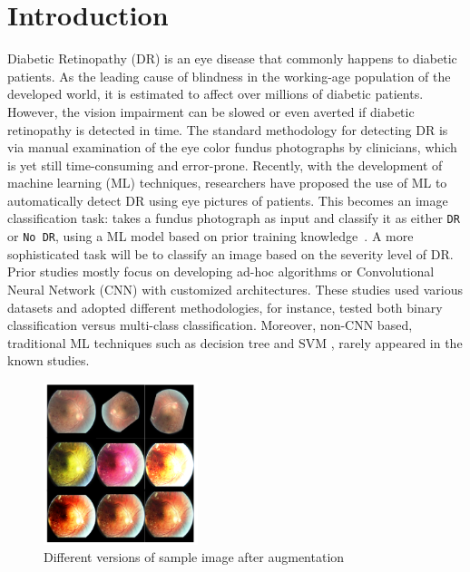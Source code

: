 \section{Introduction}

Diabetic Retinopathy (DR) is an eye disease that commonly
happens to diabetic patients. As the leading cause of blindness
in the working-age population of the developed world,
it is estimated to affect over millions of diabetic patients.
However, the vision impairment can be slowed or
even averted if diabetic retinopathy is detected in time.
The standard methodology for detecting DR is via manual
examination of the eye color fundus photographs by clinicians, which is yet still time-consuming and error-prone. Recently, with the development of machine learning (ML) techniques, researchers have proposed the use of ML to automatically detect DR using eye pictures of patients. This becomes an image classification task: takes a fundus photograph as input and classify it as either \texttt{DR} or \texttt{No DR}, using a ML model based on prior training knowledge~\cite{1}. A more sophisticated task will be to classify an image based
on the severity level of DR. Prior studies mostly focus on
developing ad-hoc algorithms or Convolutional Neural Network
(CNN) with customized architectures. These studies used various datasets and adopted different methodologies, for instance, tested both binary classification versus multi-class classification. Moreover, non-CNN based, traditional ML techniques such as decision tree and SVM \cite{C4.5,KNN,SVM}, rarely appeared in the
known studies.


\begin{figure}[t]
\centering
\includegraphics[width=0.4\textwidth]{thumbnail.png}
\caption{Different versions of sample image after augmentation}
\label{example}
\end{figure}

